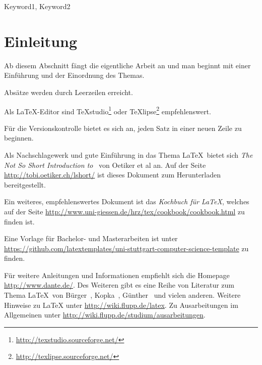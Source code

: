 \documentclass[runningheads,a4paper]{llncs}[2022/01/12]
\begin{document}
\CoverPage
\Title



\begin{abstract}
Die Kurzfassung sollte den Inhalt der Arbeit kurz wiedergeben und aus mindestens 70 und maximal 150 Wörtern bestehen.
Sie wird in einer 9-Punkt Schrift gesetzt und 1 cm eingerückt von rechts und links.
Vor und nach der Kurzfassung sind zwei leere Zeilen.
\end{abstract}

\begin{keywords}
Keyword1, Keyword2
\end{keywords}


\section{Einleitung}
Ab diesem Abschnitt fängt die eigentliche Arbeit an und man beginnt mit einer Einführung und der Einordnung des Themas.

Absätze werden durch Leerzeilen erreicht.

Als \LaTeX-Editor sind TeXstudio\footnote{\url{http://texstudio.sourceforge.net/}} oder TeXlipse\footnote{\url{http://texlipse.sourceforge.net/}} empfehlenswert.

Für die Versionskontrolle bietet es sich an, jeden Satz in einer neuen Zeile zu beginnen.

Als Nachschlagewerk und gute Einführung in das Thema \LaTeX\ bietet sich \emph{The Not So Short Introduction to \LaTeXe}\ von Oetiker et al an.
Auf der Seite \url{http://tobi.oetiker.ch/lshort/} ist dieses Dokument zum Herunterladen bereitgestellt.

Ein weiteres, empfehlenswertes Dokument ist das \emph{Kochbuch für \LaTeX{}}, welches auf der Seite \url{http://www.uni-giessen.de/hrz/tex/cookbook/cookbook.html} zu finden ist.

Eine Vorlage für Bachelor- und Masterarbeiten ist unter \url{https://github.com/latextemplates/uni-stuttgart-computer-science-template} zu finden.

Für weitere Anleitungen und Informationen empfiehlt sich die Homepage \url{http://www.dante.de/}.
Des Weiteren gibt es eine Reihe von Literatur zum Thema \LaTeX\ von Bürger~\cite{buerger}, Kopka~\cite{kopka}, Günther~\cite{guenther} und vielen anderen.
Weitere Hinweise zu \LaTeX{} unter \url{http://wiki.flupp.de/latex}.
Zu Ausarbeitungen im Allgemeinen unter \url{http://wiki.flupp.de/studium/ausarbeitungen}.
\end{document}
